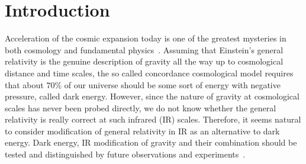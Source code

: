 \section{Introduction}
\label{sec:intro}

Acceleration of the cosmic expansion today is one of the greatest
mysteries in both cosmology and fundamental
physics~\cite{Riess:1998cb,Perlmutter:1998np}. Assuming that Einstein's
general relativity is the genuine description of gravity all the way up 
to cosmological distance and time scales, the so called concordance 
cosmological model requires that about $70\%$ of our universe should be
some sort of energy with negative pressure, called dark energy. However,
since the nature of gravity at cosmological scales has never been probed
directly, we do not know whether the general relativity is really
correct at such infrared (IR) scales. Therefore, it seems natural to
consider modification of general relativity in IR as an alternative to
dark energy. Dark energy, IR modification of gravity and their
combination should be tested and distinguished by future observations
and
experiments~\cite{Linder:2005in,Ishak:2005zs,Bertschinger:2006aw,Shirata:2005yr,Yamamoto:2006yv}. 



